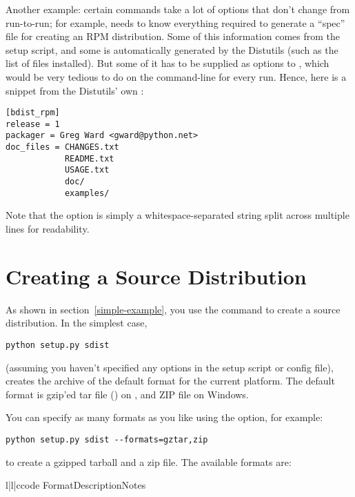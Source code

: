 \documentclass{howto}
\begin{document}
Another example: certain commands take a lot of options that don't
change from run-to-run; for example,  needs to know
everything required to generate a ``spec'' file for creating an RPM
distribution.  Some of this information comes from the setup script, and
some is automatically generated by the Distutils (such as the list of
files installed).  But some of it has to be supplied as options to
, which would be very tedious to do on the
command-line for every run.  Hence, here is a snippet from the
Distutils' own :
\begin{verbatim}
[bdist_rpm]
release = 1
packager = Greg Ward <gward@python.net>
doc_files = CHANGES.txt
            README.txt
            USAGE.txt
            doc/
            examples/
\end{verbatim}
Note that the  option is simply a
whitespace-separated string split across multiple lines for readability.


\section{Creating a Source Distribution}
\label{source-dist}

As shown in section~\ref{simple-example}, you use the
 command to create a source distribution.  In the
simplest case,
\begin{verbatim}
python setup.py sdist
\end{verbatim}
(assuming you haven't specified any  options in the setup
script or config file),  creates the archive of the
default format for the current platform.  The default format is gzip'ed
tar file () on \UNIX, and ZIP file on Windows.

You can specify as many formats as you like using the
 option, for example:
\begin{verbatim}
python setup.py sdist --formats=gztar,zip
\end{verbatim}
to create a gzipped tarball and a zip file.  The available formats are:
\begin{tableiii}{l|l|c}{code}%
  {Format}{Description}{Notes}
\end{tableiii}
\end{document}
